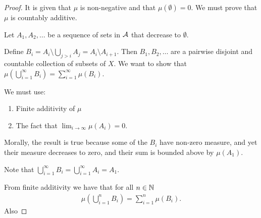 \begin{proof}


  It is given that $\mu$ is non-negative and that $\mu(\emptyset) = 0$. We must prove that $\mu$ is countably
  additive.

  Let $A_1, A_2, \dots$ be a sequence of sets in $\mathcal A$ that decrease to $\emptyset$.

  Define $B_i = A_i \setminus \bigcup_{j > i} A_j = A_i \setminus A_{i+1}$. Then $B_1, B_2, \dots$ are a
  pairwise disjoint and countable collection of subsets of $X$. We want to show
  that $\mu(\bigcup_{i=1}^\infty B_i) = \sum_{i=1}^\infty \mu(B_i)$.

  We must use:
  \begin{enumerate}
  \item Finite additivity of $\mu$
  \item The fact that $\lim_{i\to\infty} \mu(A_i) = 0$.
  \end{enumerate}

  Morally, the result is true because some of the $B_i$ have non-zero measure, and yet their measure decreases
  to zero, and their sum is bounded above by $\mu(A_1)$.


  Note that $\bigcup_{i=1}^\infty B_i = \bigcup_{i=1}^\infty A_i = A_1$.

  From finite additivity we have that for all $n \in \mathbb{N}$
  \begin{align*}
    \mu(\bigcup_{i=1}^n B_i) = \sum_{i=1}^n \mu(B_i).
  \end{align*}
  Also



\end{proof}


